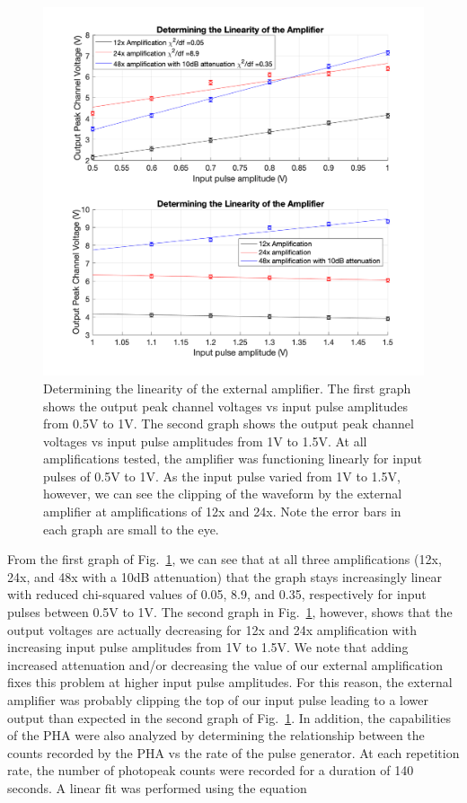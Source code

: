 \documentclass[%
 aip,
rsi,%
 amsmath,amssymb,
 reprint,%
author-numerical,%
]{revtex4-1}
\begin{document}
\begin{figure}[H]
\includegraphics[width=1.1\linewidth]{lateximages/linearity.png} 
\caption{\label{fig:linearity} Determining the linearity of the external amplifier. The first graph shows the output peak channel voltages vs input pulse amplitudes from 0.5V to 1V. The second graph shows the output peak channel voltages vs input pulse amplitudes from 1V to 1.5V. At all amplifications tested, the amplifier was functioning linearly for input pulses of 0.5V to 1V. As the input pulse varied from 1V to 1.5V, however, we can see the clipping of the waveform by the external amplifier at amplifications of 12x and 24x. Note the error bars in each graph are small to the eye.}
\end{figure}

From the first graph of Fig.~\ref{fig:linearity}, we can see that at all three amplifications (12x, 24x, and 48x with a 10dB attenuation) that the graph stays increasingly linear with reduced chi-squared values of 0.05, 8.9, and 0.35, respectively for input pulses between 0.5V to 1V. The second graph in Fig.~\ref{fig:linearity}, however, shows that the output voltages are actually decreasing for 12x and 24x amplification with increasing input pulse amplitudes from 1V to 1.5V. We note that adding increased attenuation and/or decreasing the value of our external amplification fixes this problem at higher input pulse amplitudes. For this reason, the external amplifier was probably clipping the top of our input pulse leading to a lower output than expected in the second graph of Fig.~\ref{fig:linearity}. \newline
\indent In addition, the capabilities of the PHA were also analyzed by determining the relationship between the counts recorded by the PHA vs the rate of the pulse generator. At each repetition rate, the number of photopeak counts were recorded for a duration of 140 seconds. A linear fit was performed using the equation 
\end{document}
